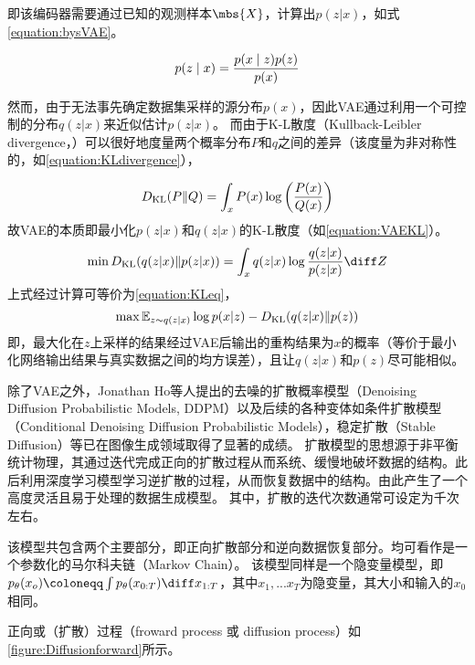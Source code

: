 即该编码器需要通过已知的观测样本$\mbs{X}$，计算出$p(z|x)$，如式\cref{equation:bysVAE}。

\begin{equation}
  \centering
  \label{equation:bysVAE}
  p(z \mid x) = \frac{p(x \mid z)p(z)}{p(x)} 
\end{equation}

然而，由于无法事先确定数据集采样的源分布$p(x)$，因此VAE通过利用一个可控制的分布$q(z|x)$来近似估计$p(z|x)$。
而由于K-L散度（Kullback-Leibler divergence，）可以很好地度量两个概率分布$P$和$q$之间的差异（该度量为非对称性的，如\cref{equation:KLdivergence}），

\begin{equation}
  \centering
  \label{equation:KLdivergence}
  D_{\text{KL}}(P \| Q) = \int_{x} P(x) \log \left( \frac{P(x)}{Q(x)} \right)
\end{equation}
故VAE的本质即最小化$p(z|x)$和$q(z|x)$的K-L散度（如\cref{equation:VAEKL}）。
\begin{equation}
  \centering
  \label{equation:VAEKL}
  \min D_{\text{KL}}(q(z|x)\|p(z|x)) = \int_{x}q(z|x)\log \frac{q(z|x)}{p(z|x)}\diff Z
\end{equation}
上式经过计算可等价为\cref{equation:KLeq}，
\begin{equation}
  \centering
  \max  \mathbb{E}_{z\sim q(z|x)} \log p(x|z) - D_{\text{KL}}(q(z|x)\|p(z))
  \label{equation:KLeq}
\end{equation}
即，最大化在$z$上采样的结果经过VAE后输出的重构结果为$x$的概率（等价于最小化网络输出结果与真实数据之间的均方误差），且让$q(z|x)$和$p(z)$尽可能相似。


除了VAE之外，Jonathan Ho等人提出的去噪的扩散概率模型\cite{DDPM}（Denoising Diffusion Probabilistic Models, DDPM）以及后续的各种变体如条件扩散模型\cite{CondDDPM}（Conditional Denoising Diffusion Probabilistic Models），稳定扩散\cite{StableDiffusion}（Stable Diffusion）等已在图像生成领域取得了显著的成绩。
扩散模型的思想源于非平衡统计物理，其通过迭代完成正向的扩散过程从而系统、缓慢地破坏数据的结构。此后利用深度学习模型学习逆扩散的过程，从而恢复数据中的结构。由此产生了一个高度灵活且易于处理的数据生成模型。
其中，扩散的迭代次数通常可设定为千次左右。

该模型共包含两个主要部分，即正向扩散部分和逆向数据恢复部分。均可看作是一个参数化的马尔科夫链（Markov Chain）。
该模型同样是一个隐变量模型，即$p_\theta(x_o) \coloneqq \int p_\theta(x_{0:T})\diff x_{1:T}$，其中$x_1,...x_T$为隐变量，其大小和输入的$x_0$相同。

正向或（扩散）过程（froward process 或 diffusion process）如\cref{figure:Diffusionforward}所示。

